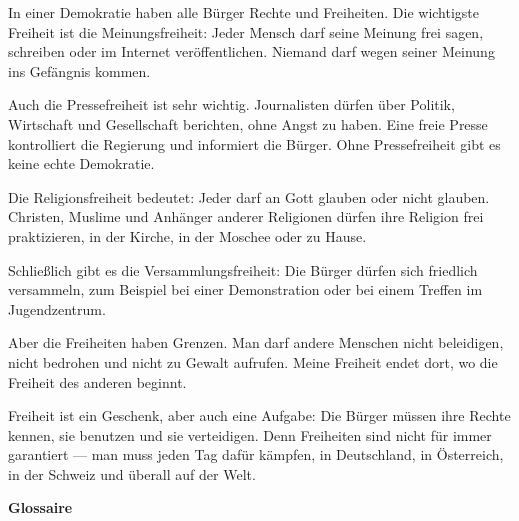 \documentclass[11pt]{article}
\begin{document}
\begin{textebox}
In einer Demokratie haben alle Bürger Rechte und Freiheiten. Die wichtigste Freiheit ist die Meinungsfreiheit: Jeder Mensch darf seine Meinung frei sagen, schreiben oder im Internet veröffentlichen. Niemand darf wegen seiner Meinung ins Gefängnis kommen.

Auch die Pressefreiheit ist sehr wichtig. Journalisten dürfen über Politik, Wirtschaft und Gesellschaft berichten, ohne Angst zu haben. Eine freie Presse kontrolliert die Regierung und informiert die Bürger. Ohne Pressefreiheit gibt es keine echte Demokratie.

Die Religionsfreiheit bedeutet: Jeder darf an Gott glauben oder nicht glauben. Christen, Muslime und Anhänger anderer Religionen dürfen ihre Religion frei praktizieren, in der Kirche, in der Moschee oder zu Hause.

Schließlich gibt es die Versammlungsfreiheit: Die Bürger dürfen sich friedlich versammeln, zum Beispiel bei einer Demonstration oder bei einem Treffen im Jugendzentrum.

Aber die Freiheiten haben Grenzen. Man darf andere Menschen nicht beleidigen, nicht bedrohen und nicht zu Gewalt aufrufen. Meine Freiheit endet dort, wo die Freiheit des anderen beginnt.

Freiheit ist ein Geschenk, aber auch eine Aufgabe: Die Bürger müssen ihre Rechte kennen, sie benutzen und sie verteidigen. Denn Freiheiten sind nicht für immer garantiert — man muss jeden Tag dafür kämpfen, in Deutschland, in Österreich, in der Schweiz und überall auf der Welt.
\end{textebox}

\textbf{Glossaire}
\end{document}
